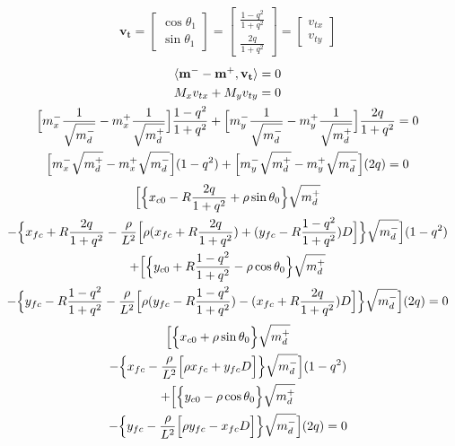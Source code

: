 \documentclass[12pt]{article}
\begin{document}
\begin{align}
    \mathbf{v_t} = \begin{bmatrix}
        \cos\theta_1\\
        \sin\theta_1
    \end{bmatrix}
    = \begin{bmatrix}
        \frac{1-q^2}{1+q^2}\\
        \frac{2q}{1+q^2}
    \end{bmatrix}
    = \begin{bmatrix}
        v_{tx}\\
        v_{ty}
    \end{bmatrix}
\end{align}
\begin{gather}
    \langle \mathbf{m^-} - \mathbf{m^+}, \mathbf{v_t} \rangle = 0\\
    M_x v_{tx} + M_yv_{ty} = 0\\
    \Bigl[m_x^-\frac{1}{\sqrt{m_d^-}} - m_x^+\frac{1}{\sqrt{m_d^+}}\Bigr]\frac{1-q^2}{1+q^2} + \Bigl[ m_y^-\frac{1}{\sqrt{m_d^-}} - m_y^+\frac{1}{\sqrt{m_d^+}} \Bigr]\frac{2q}{1+q^2} = 0\\
    \Bigl[m_x^-\sqrt{m_d^+} - m_x^+\sqrt{m_d^-}\Bigr](1-q^2) + \Bigl[ m_y^-\sqrt{m_d^+} - m_y^+\sqrt{m_d^-} \Bigr](2q) = 0\\
\end{gather}
\begin{gather}
    \Bigl[\Bigl\{ x_{c0} -R\frac{2q}{1+q^2} +\rho\sin\theta_0 \Bigr\}\sqrt{m_d^+} \nonumber\\
    - \Bigl\{ x_{fc} +R\frac{2q}{1+q^2} -\frac{\rho}{L^2}\Bigl[\rho(x_{fc} + R\frac{2q}{1+q^2}) + (y_{fc}-R\frac{1-q^2}{1+q^2})D\Bigr] \Bigr\} \sqrt{m_d^-}\Bigr](1-q^2) \nonumber\\
    + \Bigl[ \Big\{y_{c0} + R\frac{1-q^2}{1+q^2} - \rho\cos\theta_0 \Bigr\}\sqrt{m_d^+} \nonumber\\
    - \Bigl\{ y_{fc} -R\frac{1-q^2}{1+q^2} -\frac{\rho}{L^2}\Bigl[\rho(y_{fc}-R\frac{1-q^2}{1+q^2}) - (x_{fc} + R\frac{2q}{1+q^2})D\Bigr] \Bigr\} \sqrt{m_d^-} \Bigr](2q) = 0\\
\end{gather}
\begin{gather}
    \Bigl[\Bigl\{ x_{c0} +\rho\sin\theta_0 \Bigr\}\sqrt{m_d^+} \nonumber\\
    - \Bigl\{ x_{fc} -\frac{\rho}{L^2}\Bigl[\rho x_{fc} + y_{fc}D\Bigr] \Bigr\} \sqrt{m_d^-}\Bigr](1-q^2) \nonumber\\
    + \Bigl[ \Big\{y_{c0} - \rho\cos\theta_0 \Bigr\}\sqrt{m_d^+} \nonumber\\
    - \Bigl\{ y_{fc} -\frac{\rho}{L^2}\Bigl[\rho y_{fc} - x_{fc}D\Bigr] \Bigr\} \sqrt{m_d^-} \Bigr](2q) = 0
\end{gather}
\end{document}
